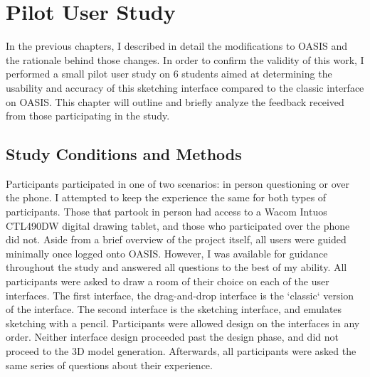 \chapter{Pilot User Study} \label{sec:pilot}

In the previous chapters, I described in detail the modifications to OASIS and the rationale behind those changes. In order to confirm the validity of this work, I performed a small pilot user study on 6 students aimed at determining the usability and accuracy of this sketching interface compared to the classic interface on OASIS. This chapter will outline and briefly analyze the feedback received from those participating in the study.

\section{Study Conditions and Methods}


Participants participated in one of two scenarios: in person questioning or over the phone. I attempted to keep the experience the same for both types of participants. Those that partook in person had access to a Wacom Intuos CTL490DW digital drawing tablet, and those who participated over the phone did not. Aside from a brief overview of the project itself, all users were guided minimally once logged onto OASIS. However, I was available for guidance throughout the study and answered all questions to the best of my ability. All participants were asked to draw a room of their choice on each of the user interfaces. The first interface, the drag-and-drop interface is the `classic` version of the interface. The second interface is the sketching interface, and emulates sketching with a pencil. Participants were allowed design on the interfaces in any order. Neither interface design proceeded past the design phase, and did not proceed to the 3D model generation. Afterwards, all participants were asked the same series of questions about their experience. 

